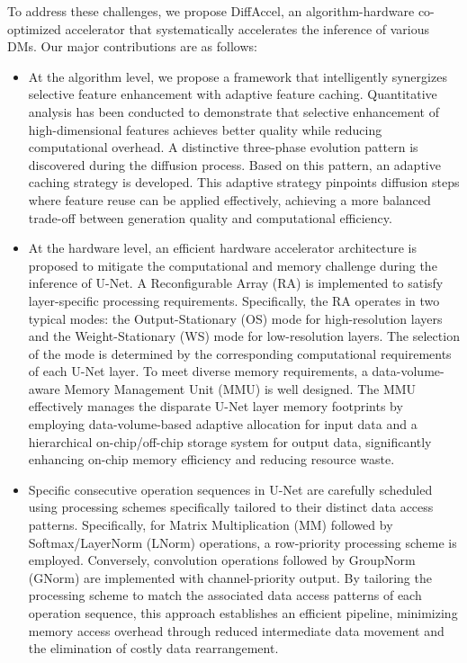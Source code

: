To address these challenges, we propose DiffAccel, an algorithm-hardware co-optimized accelerator that systematically accelerates the inference of various DMs. Our major contributions are as follows:
\begin{itemize}
\item{} At the algorithm level, we propose a framework that intelligently synergizes selective feature enhancement with adaptive feature caching. Quantitative analysis has been conducted to demonstrate that selective enhancement of high-dimensional features achieves better quality while reducing computational overhead. A distinctive three-phase evolution pattern is discovered during the diffusion process. Based on this pattern, an adaptive caching strategy is developed. This adaptive strategy pinpoints diffusion steps where feature reuse can be applied effectively, achieving a more balanced trade-off between generation quality and computational efficiency.

\item{} At the hardware level, an efficient hardware accelerator architecture is proposed to mitigate the computational and memory challenge during the inference of U-Net. A Reconfigurable Array (RA) is implemented to satisfy layer-specific processing requirements. Specifically, the RA operates in two typical modes: the Output-Stationary (OS) mode for high-resolution layers and the Weight-Stationary (WS) mode for low-resolution layers. The selection of the mode is determined by the corresponding computational requirements of each U-Net layer. To meet diverse memory requirements, a data-volume-aware Memory Management Unit (MMU) is well designed. The MMU effectively manages the disparate U-Net layer memory footprints by employing data-volume-based adaptive allocation for input data and a hierarchical on-chip/off-chip storage system for output data, significantly enhancing on-chip memory efficiency and reducing resource waste.

\item{} Specific consecutive operation sequences in U-Net are carefully scheduled using processing schemes specifically tailored to their distinct data access patterns. Specifically, for Matrix Multiplication (MM) followed by Softmax/LayerNorm (LNorm) \cite{attention} operations, a row-priority processing scheme is employed. Conversely, convolution operations followed by GroupNorm (GNorm) \cite{groupnorm} are implemented with channel-priority output. By tailoring the processing scheme to match the associated data access patterns of each operation sequence, this approach establishes an efficient pipeline, minimizing memory access overhead through reduced intermediate data movement and the elimination of costly data rearrangement.


\end{itemize}

